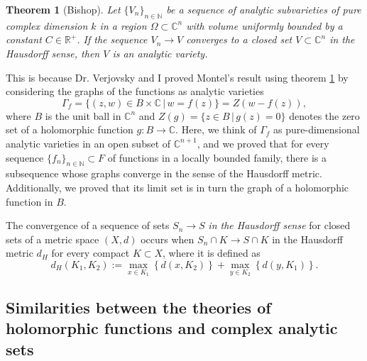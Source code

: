 \documentclass{article}
\newtheorem{theorem}{Theorem}
\newcommand{\nat}{\ensuremath{ \mathbb N }}
\newcommand{\co}{\ensuremath{\mathbb C }}
\newcommand{\con}{\ensuremath{\mathbb{C}^n}}
\newcommand{\re}{\ensuremath{\mathbb R }}
\begin{document}
\begin{theorem}[Bishop]\label{Bishop2}
        Let $\{ V_n \}_{n\in\nat}$ be a sequence of analytic subvarieties of pure complex dimension $k$ in a region
        $\Omega\subset\con$ with volume uniformly bounded by a constant $C\in\re^{+}$.
        If the sequence $V_n\rightarrow V$ converges to a closed set $V\subset\con$ in the Hausdorff sense, then $V$ is an
        analytic variety.
\end{theorem}
This is because Dr. Verjovsky and I proved Montel's result using theorem \ref{Bishop2} by considering the graphs of the
functions as analytic varieties
\[
        \Gamma_{f}=\{(z,w)\in B\times\co\,|\,w=f(z)\}=Z(w-f(z)),
\]
\noindent where $B$ is the unit ball in $\con$ and $Z(g)=\{z\in B\,|\,g(z)=0\}$ denotes the zero set of a holomorphic function $g:B\rightarrow\co$. Here, we think of $\Gamma_{f}$ as pure-dimensional analytic varieties in an open subset of $\co^{n+1}$, and we proved
that for every sequence $\{f_n\}_{n\in\nat}\subset F$ of functions in a locally bounded family, there is a subsequence
whose graphs converge in the sense of the Hausdorff metric. Additionally, we proved that its limit set
is in turn the graph of a holomorphic function in $B$.

The convergence of a sequence of sets $S_n\rightarrow S$ \emph{in the Hausdorff sense} for closed sets of a metric space $(X,d)$
occurs when $S_n\cap K\rightarrow S\cap K$ in the Hausdorff metric $d_H$ for every compact $K\subset X$, where it is defined as
\[
        d_H(K_1,K_2):= \max_{x\in K_1}\left\{d(x,K_2)\right\}+\max_{y\in K_2}\left\{d(y,K_1)\right\}.
\]

\subsection{Similarities between the theories of holomorphic functions and complex analytic sets}
\end{document}
